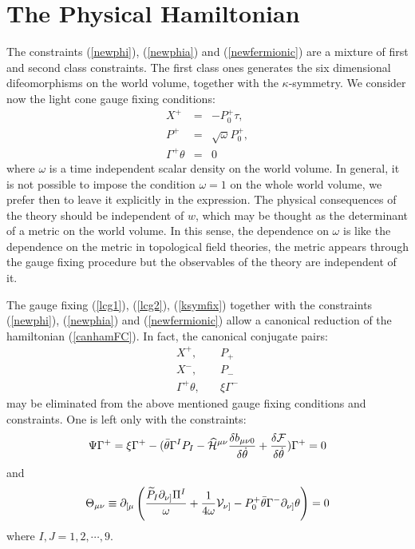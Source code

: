 \documentclass[a4paper,12pt]{article}
\def\HCH{\widehat{\cal{H}}}
\def\btheta{\bar{\theta}}
\def\CF{\cal{F}}
\def\CV{\cal{V}}
\begin{document}
\section{The Physical Hamiltonian}
The constraints (\ref{newphi}), (\ref{newphia}) and
(\ref{newfermionic})   are a mixture of first and second class
constraints. The first class ones generates the six dimensional
difeomorphisms on the world volume, together with the
$\kappa$-symmetry. We consider now the light cone gauge fixing
conditions:
\begin{eqnarray}
X^+&=&-P^+_0\tau,\label{lcg1}\\ P^+&=&\sqrt{\omega}P^+_0,\label{lcg2}\\
\Gamma^+\theta &=&0\label{ksymfix}
\end{eqnarray}
where $\omega$ is a time independent scalar density on the world
volume. In general, it is not possible to impose the condition
$\omega=1$ on the whole world volume, we prefer then to leave it
explicitly in the expression. The physical consequences of the
theory should be independent of $w$, which may be thought as the
determinant of a metric on the world volume. In this sense, the
dependence on $\omega$ is like the dependence on the metric in
topological field theories, the metric appears through the gauge
fixing procedure but the observables of the theory are independent
of it.


The gauge fixing (\ref{lcg1}), (\ref{lcg2}),  (\ref{ksymfix})
together with the constraints (\ref{newphi}), (\ref{newphia}) and
(\ref{newfermionic}) allow a canonical reduction of the
hamiltonian (\ref{canhamFC}). In fact, the canonical conjugate
pairs:
\begin{equation*}
\begin{split}
X^+,&\quad P_+\\ X^-,&\quad P_-\\
\Gamma^+\theta,&\quad \xi\Gamma^-
\end{split}\end{equation*}
may be eliminated from the above mentioned gauge fixing conditions
and constraints. One is left only with the constraints:
\begin{equation}\label{C1}
\Psi\Gamma^+=\xi\Gamma^+ -(\btheta\Gamma^I
P_I-{\HCH^{\mu\nu}}\frac{\delta
b_{\mu\nu0}}{\delta\dot{\theta}}+\frac{\delta
{\CF}}{\delta\dot{\theta}})\Gamma^+ =0
\end{equation}
and
\begin{equation}\label{C2}
\Theta_{\mu\nu}\equiv\partial_{[\mu}\left(\displaystyle\frac{\widetilde{P}_I\partial_{\nu]}\Pi^I}{\omega}+{1\over
4
\omega}{\CV}_{\nu]}-P_0^+\btheta\Gamma^-\partial_{\nu]}\theta\right)=0
\end{equation}
where $I,J= 1,2,\cdots,9$.
\end{document}
